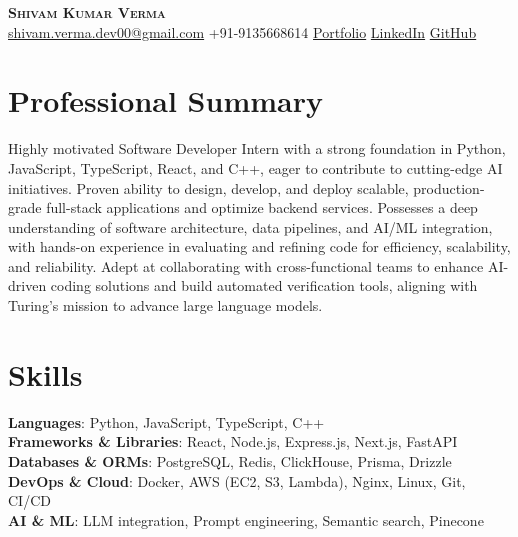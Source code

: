 \documentclass[letterpaper,10pt]{article}
\begin{document}
\begin{center}
  \textbf{\Huge \scshape Shivam Kumar Verma} \\ \vspace{4pt}
  \small \href{mailto:shivam.verma.dev00@gmail.com}{shivam.verma.dev00@gmail.com} \textbullet{} +91-9135668614 \textbullet{} \href{Portfolio}{Portfolio} \textbullet{} \href{LinkedIn}{LinkedIn} \textbullet{} \href{GitHub}{GitHub}
\end{center}

\section{Professional Summary}
\vspace{3pt}
\small{Highly motivated Software Developer Intern with a strong foundation in Python, JavaScript, TypeScript, React, and C++, eager to contribute to cutting-edge AI initiatives. Proven ability to design, develop, and deploy scalable, production-grade full-stack applications and optimize backend services. Possesses a deep understanding of software architecture, data pipelines, and AI/ML integration, with hands-on experience in evaluating and refining code for efficiency, scalability, and reliability. Adept at collaborating with cross-functional teams to enhance AI-driven coding solutions and build automated verification tools, aligning with Turing's mission to advance large language models.}

\section{Skills}
\begin{itemize}[leftmargin=0.15in, label={}]
  \small{\item{
    \textbf{Languages}{: Python, JavaScript, TypeScript, C++} \\ \vspace{2pt}
    \textbf{Frameworks \& Libraries}{: React, Node.js, Express.js, Next.js, FastAPI} \\ \vspace{2pt}
    \textbf{Databases \& ORMs}{: PostgreSQL, Redis, ClickHouse, Prisma, Drizzle} \\ \vspace{2pt}
    \textbf{DevOps \& Cloud}{: Docker, AWS (EC2, S3, Lambda), Nginx, Linux, Git, CI/CD} \\ \vspace{2pt}
    \textbf{AI \& ML}{: LLM integration, Prompt engineering, Semantic search, Pinecone}
  }}
\end{itemize}
\end{document}
